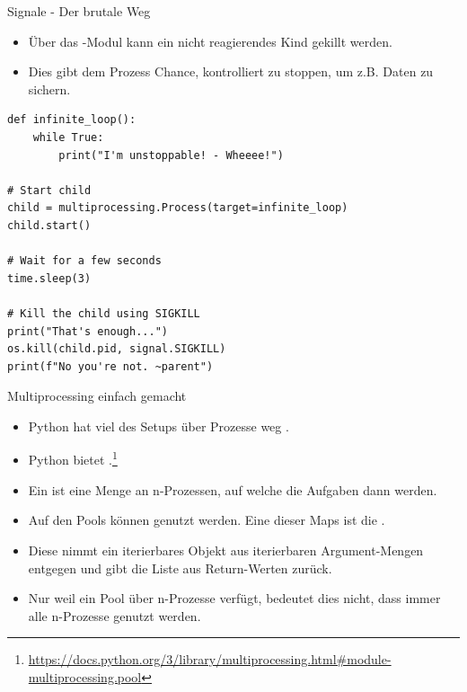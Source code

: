 \documentclass[12pt, aspectratio=169, usepdftitle=false]{beamer}
\newcommand{\pp}[1]{\lpl{#1}}
\begin{document}
\begin{frame}[fragile]{Signale - Der brutale Weg}
	\begin{itemize}
		\item Über das \pp{os}-Modul kann ein nicht reagierendes Kind  gekillt werden.
		
		\pause
		
		\item Dies gibt dem Prozess  Chance, kontrolliert zu stoppen, um z.B. Daten zu sichern.
	\end{itemize}
	\begin{lstlisting}[language=pytiny]
def infinite_loop():
    while True:
        print("I'm unstoppable! - Wheeee!")

# Start child
child = multiprocessing.Process(target=infinite_loop)
child.start()

# Wait for a few seconds
time.sleep(3)

# Kill the child using SIGKILL
print("That's enough...")
os.kill(child.pid, signal.SIGKILL)
print(f"No you're not. ~parent")
	\end{lstlisting}
\end{frame}


\begin{frame}[fragile]{Multiprocessing einfach gemacht}
	\begin{itemize}
		\item Python hat viel des Setups über Prozesse weg .
		
		\pause
		\item Python bietet .\footnote{\url{https://docs.python.org/3/library/multiprocessing.html\#module-multiprocessing.pool}}
		\item[] Ein \pp{Pool} ist eine Menge an n-Prozessen, auf welche die Aufgaben dann  werden.
		\pause
		
		\item Auf den Pools können  genutzt werden. Eine dieser Maps ist die \pp{starmap}.
		\item[] Diese nimmt ein iterierbares Objekt aus iterierbaren Argument-Mengen entgegen und gibt die Liste aus Return-Werten zurück.
		
		\pause
		\item Nur weil ein Pool über n-Prozesse verfügt, bedeutet dies nicht, dass immer alle n-Prozesse genutzt werden.
	\end{itemize}
\end{frame}
\end{document}
